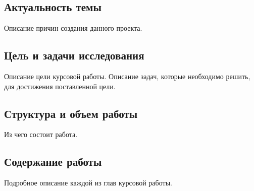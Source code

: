 \newpage
{}
\subsection*{Актуальность темы}
Описание причин создания данного проекта.
\subsection*{Цель и задачи исследования}
Описание цели курсовой работы. Описание задач, которые необходимо решить, для достижения поставленной цели.
\subsection*{Структура и объем работы}
Из чего состоит работа. 
\subsection*{Содержание работы}
Подробное описание каждой из глав курсовой работы.
